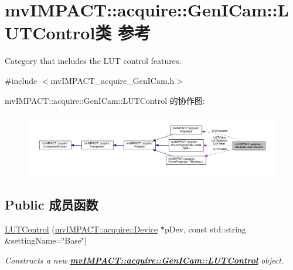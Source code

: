 \hypertarget{classmv_i_m_p_a_c_t_1_1acquire_1_1_gen_i_cam_1_1_l_u_t_control}{\section{mv\+I\+M\+P\+A\+C\+T\+:\+:acquire\+:\+:Gen\+I\+Cam\+:\+:L\+U\+T\+Control类 参考}
\label{classmv_i_m_p_a_c_t_1_1acquire_1_1_gen_i_cam_1_1_l_u_t_control}
}


Category that includes the L\+U\+T control features.  




{\ttfamily \#include $<$mv\+I\+M\+P\+A\+C\+T\+\_\+acquire\+\_\+\+Gen\+I\+Cam.\+h$>$}



mv\+I\+M\+P\+A\+C\+T\+:\+:acquire\+:\+:Gen\+I\+Cam\+:\+:L\+U\+T\+Control 的协作图\+:
\nopagebreak
\begin{figure}[H]
\begin{center}
\leavevmode
\includegraphics[width=350pt]{classmv_i_m_p_a_c_t_1_1acquire_1_1_gen_i_cam_1_1_l_u_t_control__coll__graph}
\end{center}
\end{figure}
\subsection*{Public 成员函数}
\begin{DoxyCompactItemize}
\item 
\hyperlink{classmv_i_m_p_a_c_t_1_1acquire_1_1_gen_i_cam_1_1_l_u_t_control_a9b9e73a05f8f0c7888ef54585c797ee7}{L\+U\+T\+Control} (\hyperlink{classmv_i_m_p_a_c_t_1_1acquire_1_1_device}{mv\+I\+M\+P\+A\+C\+T\+::acquire\+::\+Device} $\ast$p\+Dev, const std\+::string \&setting\+Name=\char`\"{}Base\char`\"{})
\begin{DoxyCompactList}\small\item\em Constructs a new {\bfseries \hyperlink{classmv_i_m_p_a_c_t_1_1acquire_1_1_gen_i_cam_1_1_l_u_t_control}{mv\+I\+M\+P\+A\+C\+T\+::acquire\+::\+Gen\+I\+Cam\+::\+L\+U\+T\+Control}} object. \end{DoxyCompactList}\end{DoxyCompactItemize}
